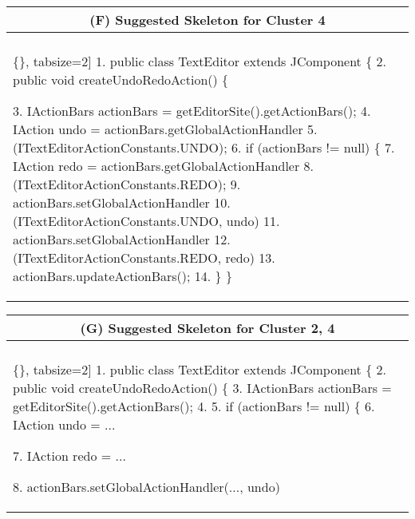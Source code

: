 \begin{figure*}[!htb]
\begin{minipage}{0.5\textwidth}
\begin{tabular}{@{}p{}}
  \\     
\end{tabular} 
\end{minipage}
 \begin{minipage}{0.5\textwidth}
\scriptsize 
\begin{tabular}{@{}p{}} 
 \hline 
  \multicolumn{1}{c}{(F) Suggested Skeleton for Cluster 4} \\ \hline
  \vspace{-4mm}
\begin{Verbatim}[commandchars=\\\{\}, tabsize=2]
1. public class TextEditor extends JComponent \{
2.  public void createUndoRedoAction() \{
 
3.   IActionBars actionBars = getEditorSite().getActionBars();
4.    IAction undo = actionBars.getGlobalActionHandler
5.      (ITextEditorActionConstants.UNDO);
6.    if (actionBars != null) \{
7.      IAction redo = actionBars.getGlobalActionHandler
8.        (ITextEditorActionConstants.REDO);             
9.     actionBars.setGlobalActionHandler
10.      (ITextEditorActionConstants.UNDO, undo)
11.    actionBars.setGlobalActionHandler
12.      (ITextEditorActionConstants.REDO, redo)   
13.    actionBars.updateActionBars();  
14.  \} \}
 \end{Verbatim}
      \vspace{-4mm}
  \\    
\end{tabular} 
\end{minipage}
 \begin{minipage}{0.5\textwidth}
\scriptsize 
\begin{tabular}{@{}p{}} 
 \hline 
  \multicolumn{1}{c}{(G) Suggested Skeleton for Cluster 2, 4} \\ \hline
  \vspace{-4mm}
\begin{Verbatim}[commandchars=\\\{\}, tabsize=2]
1. public class TextEditor extends JComponent \{
2.  public void createUndoRedoAction() \{
3.    IActionBars actionBars = getEditorSite().getActionBars();
4.
5.    if (actionBars != null) \{
6.      IAction undo = ...      

7.      IAction redo = ...
        
8.     actionBars.setGlobalActionHandler(..., undo)
     

\end{Verbatim}
\end{tabular}
\end{minipage}
\end{figure*}
